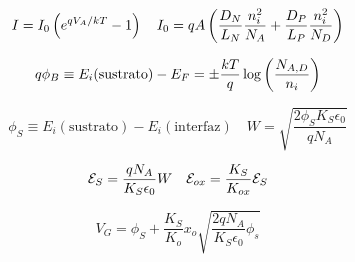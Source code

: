 {\begin{multicols}{2}
	\begin{Formulario}
		\begin{equation*}
			I = I_0 \left( e^{qV_A/kT}-1 \right)  \quad
			I_0 = qA \left( \frac{D_N}{L_N} \frac{n_i^2}{N_A} + \frac{D_P}{L_P} \frac{n_i^2}{N_D} \right)
		\end{equation*}
	\end{Formulario}
    \begin{Formulario}
        \begin{equation*}
           q \phi_B \equiv  E_i(\text{sustrato}) - E_F 
            = \pm \frac{kT}{q} \log \left( \frac{N_{A,D}}{n_i} \right) 
        \end{equation*}
    \end{Formulario}
    \begin{Formulario}
        \begin{equation*} 
        	\phi_S \equiv E_i(\text{sustrato}) - E_i (\text{interfaz}) \quad 
            W = \sqrt{\frac{2\phi_S K_S \epsilon_0}{qN_A}} 
        \end{equation*}
    \end{Formulario}
    \begin{Formulario}
        \begin{equation*}
             \mathcal{E}_S = \frac{qN_A}{K_S \epsilon_0} W \quad \mathcal{E}_{ox} = \frac{K_S}{K_{ox}} \mathcal{E}_S
        \end{equation*}
    \end{Formulario}
    \begin{Formulario}
        \begin{equation*}
	        V_G = \phi_S + \frac{K_S}{K_o} x_o \sqrt{\frac{2qN_A}{K_S\epsilon_0} \phi_s}
        \end{equation*}
    \end{Formulario}


\end{multicols}
}